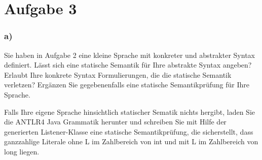 \chapter{Aufgabe 3}
\label{sec:aufgabe3}

\subsection*{a)}
Sie haben in Aufgabe 2 eine kleine Sprache mit konkreter und abstrakter Syntax definiert.
Lässt sich eine statische Semantik für Ihre abstrakte Syntax angeben?
Erlaubt Ihre konkrete Syntax Formulierungen, die die statische Semantik verletzen?
Ergänzen Sie gegebenenfalls eine statische Semantikprüfung für Ihre Sprache.

Falls Ihre eigene Sprache hinsichtlich statischer Sematik nichts hergibt,
laden Sie die ANTLR4 Java Grammatik herunter und schreiben Sie mit Hilfe der generierten Listener-Klasse eine statische Semantikprüfung,
die sicherstellt, dass ganzzahlige Literale ohne L im Zahlbereich von int und mit L im Zahlbereich von long liegen.

